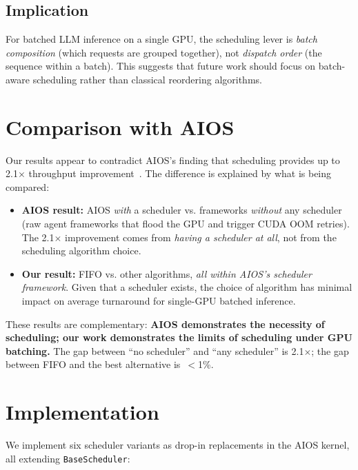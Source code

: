 \documentclass[conference]{IEEEtran}
\begin{document}
\subsection{Implication}
For batched LLM inference on a single GPU, the scheduling lever is \textit{batch composition} (which requests are grouped together), not \textit{dispatch order} (the sequence within a batch). This suggests that future work should focus on batch-aware scheduling rather than classical reordering algorithms.

\section{Comparison with AIOS}

Our results appear to contradict AIOS's finding that scheduling provides up to 2.1$\times$ throughput improvement~\cite{mei2025aios}. The difference is explained by what is being compared:

\begin{itemize}
    \item \textbf{AIOS result:} AIOS \textit{with} a scheduler vs. frameworks \textit{without} any scheduler (raw agent frameworks that flood the GPU and trigger CUDA OOM retries). The 2.1$\times$ improvement comes from \textit{having a scheduler at all}, not from the scheduling algorithm choice.
    \item \textbf{Our result:} FIFO vs. other algorithms, \textit{all within AIOS's scheduler framework}. Given that a scheduler exists, the choice of algorithm has minimal impact on average turnaround for single-GPU batched inference.
\end{itemize}

These results are complementary: \textbf{AIOS demonstrates the necessity of scheduling; our work demonstrates the limits of scheduling under GPU batching.} The gap between ``no scheduler'' and ``any scheduler'' is 2.1$\times$; the gap between FIFO and the best alternative is~$<$1\%.

\section{Implementation}

We implement six scheduler variants as drop-in replacements in the AIOS kernel, all extending \texttt{BaseScheduler}:
\end{document}
